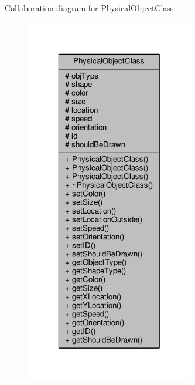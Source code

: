 Collaboration diagram for Physical\-Object\-Class\-:
\nopagebreak
\begin{figure}[H]
\begin{center}
\leavevmode
\includegraphics[width=208pt]{classPhysicalObjectClass__coll__graph}
\end{center}
\end{figure}
